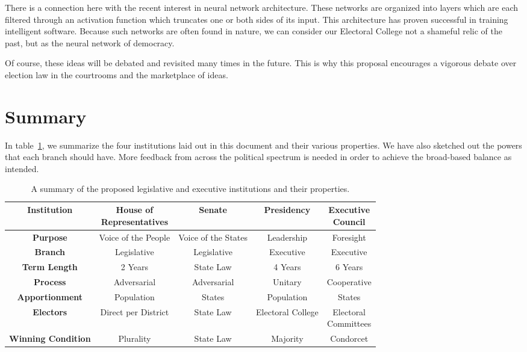 \documentclass{article}
\begin{document}
There is a connection here with the recent interest in neural network architecture. These networks are organized into layers which are each filtered through an activation function which truncates one or both sides of its input. This architecture has proven successful in training intelligent software. Because such networks are often found in nature, we can consider our Electoral College not a shameful relic of the past, but as the neural network of democracy.

Of course, these ideas will be debated and revisited many times in the future. This is why this proposal encourages a vigorous debate over election law in the courtrooms and the marketplace of ideas.

\section{Summary}

In table~\ref{table:institutions}, we summarize the four institutions laid out in this document and their various properties. We have also sketched out the powers that each branch should have. More feedback from across the political spectrum is needed in order to achieve the broad-based balance as intended.

\begin{table}[ht]
\centering
\renewcommand{\arraystretch}{1.5}
\begin{tabular}{|c|c|c|c|c|}
\hline
\textbf{Institution} & \makecell{House of \\ Representatives} & Senate & Presidency & \makecell{Executive \\ Council}  \\
\hline
\textbf{Purpose} & Voice of the People & Voice of the States & Leadership & Foresight \\
\hline
\textbf{Branch} & Legislative & Legislative & Executive & Executive \\
\hline
\textbf{Term Length} & 2 Years & State Law & 4 Years & 6 Years \\
\hline
\textbf{Process} & Adversarial & Adversarial & Unitary & Cooperative \\
\hline
\textbf{Apportionment} & Population & States & Population & States  \\
\hline
\textbf{Electors} & Direct per District & State Law  & Electoral College & \makecell{Electoral\\Committees}  \\
\hline
\textbf{Winning Condition} & Plurality & State Law & Majority & Condorcet  \\
\hline
\end{tabular}
\caption{A summary of the proposed legislative and executive institutions and their properties. }
\label{table:institutions}
\end{table}
\end{document}
